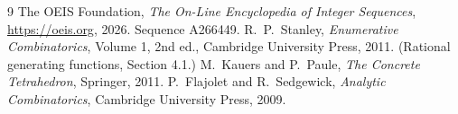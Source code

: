 \documentclass[11pt,a4paper]{article}
\theoremstyle{plain}
\theoremstyle{definition}
\begin{document}
\begin{thebibliography}{9}
 The OEIS Foundation, \emph{The On-Line Encyclopedia of Integer
Sequences}, \url{https://oeis.org}, 2026. Sequence A266449.
 R.~P.~Stanley, \emph{Enumerative Combinatorics}, Volume 1, 2nd ed.,
Cambridge University Press, 2011. (Rational generating functions, Section 4.1.)
 M.~Kauers and P.~Paule, \emph{The Concrete Tetrahedron}, Springer, 2011.
 P.~Flajolet and R.~Sedgewick, \emph{Analytic Combinatorics}, Cambridge
University Press, 2009.
\end{thebibliography}
\end{document}
